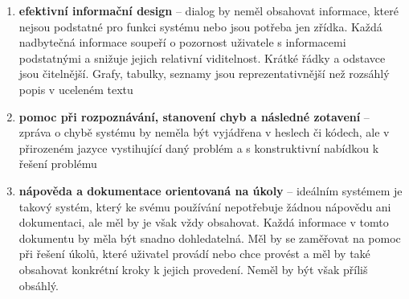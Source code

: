 \begin{enumerate}
\item \textbf{efektivní informační design} – dialog by neměl obsahovat informace, které nejsou podstatné pro funkci systému nebo jsou potřeba jen zřídka. Každá nadbytečná informace soupeří o pozornost uživatele s informacemi podstatnými a snižuje jejich relativní viditelnost. Krátké řádky a odstavce jsou čitelnější. Grafy, tabulky, seznamy jsou reprezentativnější než rozsáhlý popis v uceleném textu\cite{thesis:flamik} 

\item \textbf{pomoc při rozpoznávání, stanovení chyb a následné zotavení} – zpráva o chybě systému by neměla být vyjádřena v heslech či kódech, ale v přirozeném jazyce vystihující daný problém a s konstruktivní nabídkou k řešení problému\cite{thesis:flamik} 

\item \textbf{nápověda a dokumentace orientovaná na úkoly} – ideálním systémem je takový systém, který ke svému používání nepotřebuje žádnou nápovědu ani dokumentaci, ale měl by je však vždy obsahovat. Každá informace v tomto dokumentu by měla být snadno dohledatelná. Měl by se zaměřovat na pomoc při řešení úkolů, které uživatel provádí nebo chce provést a měl by také obsahovat konkrétní kroky k jejich provedení. Neměl by být však příliš obsáhlý.\cite{thesis:flamik}

\end{enumerate}